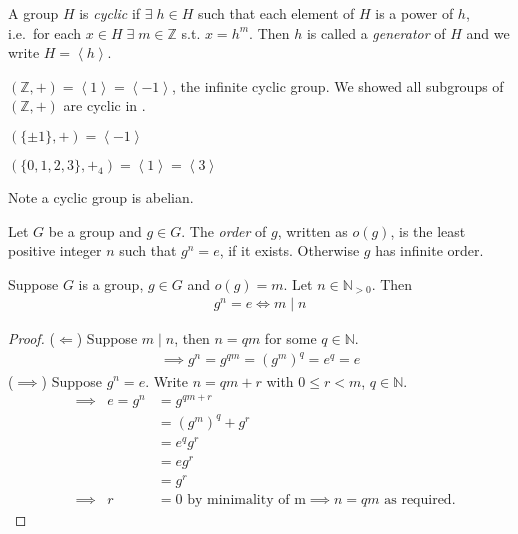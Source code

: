 \begin{definition}
A group \(H\) is \emph{cyclic} if \(\exists \; h \in H\) such that each element of \(H\) is a power of \(h\), i.e.~for each \(x \in H \; \exists \; m \in \mathbb{Z}\) s.t. \(x = h^m\).
Then \(h\) is called a \emph{generator} of \(H\) and we write \(H = \left\langle h \right\rangle\).
\end{definition}

\begin{example}
\((\mathbb{Z}, +) = \left\langle 1 \right\rangle = \left\langle -1 \right\rangle\), the infinite cyclic group.
We showed all subgroups of \((\mathbb{Z}, +)\) are cyclic in .
\end{example}

\begin{example}
\((\{ \pm 1 \}, +) = \left\langle -1 \right\rangle\)
\end{example}

\begin{example}
\((\{ 0, 1, 2, 3\}, +_4) = \left\langle 1 \right\rangle = \left\langle 3 \right\rangle\)
\end{example}

Note a cyclic group is abelian.

\begin{definition}
Let \(G\) be a group and \(g \in G\). The \emph{order} of \(g\), written as \(o(g)\), is the least positive integer \(n\) such that \(g^n = e\), if it exists. Otherwise \(g\) has infinite order.
\end{definition}

\begin{lemma}
\protect\hypertarget{lem:five}{}\label{lem:five}
Suppose \(G\) is a group, \(g \in G\) and \(o(g) = m\). Let \(n \in \mathbb{N}_{>0}\). Then
\begin{align*}
    g^n = e \iff m \mid n
\end{align*}
\end{lemma}

\begin{proof} \mbox{}
(\(\Longleftarrow\)) Suppose \(m \mid n\), then \(n = qm\) for some \(q \in \mathbb{N}\).
\begin{align*}
    \implies g^n = g^{qm} = (g^m)^q = e^q = e
\end{align*}
(\(\implies\)) Suppose \(g^n = e\). Write \(n = qm + r\) with \(0 \leq r < m\), \(q \in \mathbb{N}\).
\begin{align*}
    &\implies & e = g^n &= g^{qm + r} \\
    && &= (g^m)^q + g^r \\
    && &= e^q g^r \\
    && &= e g^r \\
    && &= g^r \\
    &\implies & r &= 0 \text{ by minimality of m} \implies n = qm \text{ as required.} 
\end{align*}
\end{proof}

